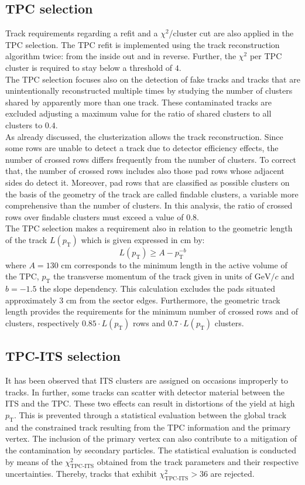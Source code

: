 \documentclass[12pt,a4paper]{report}
\begin{document}
\subsection{TPC selection}
Track requirements regarding a refit and a $\chi^2$/cluster cut are also applied in the TPC selection. The TPC refit is implemented using the track reconstruction algorithm twice: from the inside out and in reverse. Further, the $\chi^2$ per TPC cluster is required to stay below a threshold of $4$. \\
The TPC selection focuses also on the detection of fake tracks and tracks that are unintentionally reconstructed multiple times by studying the number of clusters shared by apparently more than one track. These contaminated tracks are excluded adjusting a maximum value for the ratio of shared clusters to all clusters to $0.4$.\\
As already discussed, the clusterization allows the track reconstruction. Since some rows are unable to detect a track due to detector efficiency effects, the number of crossed rows differs frequently from the number of clusters. To correct that, the number of crossed rows includes also those pad rows whose adjacent sides do detect it. Moreover, pad rows that are classified as possible clusters on the basis of the geometry of the track are called findable clusters, a variable more comprehensive than the number of clusters. In this analysis, the ratio of crossed rows over findable clusters must exceed a value of $0.8$. \\
The TPC selection makes a requirement also in relation to the geometric length of the track $L(p_\text{T})$ which is given expressed in cm by:
\begin{equation}
L(p_\text{T}) \geq A - p_\text{T}^{-b}
\end{equation}
where $A=130 \text{ cm}$ corresponds to the minimum length in the active volume of the TPC, $p_\text{T}$ the transverse momentum of the track given in units of $\text{GeV}/c$ and $b=-1.5$ the slope dependency. This calculation excludes the pads situated approximately $3\text{ cm}$ from the sector edges. Furthermore, the geometric track length provides the requirements for the minimum number of crossed rows and of clusters, respectively $0.85\cdot L(p_\text{T})$ rows and $0.7\cdot L(p_\text{T})$ clusters.
\subsection{TPC-ITS selection}
It has been observed that ITS clusters are assigned on occasions improperly to tracks. In further, some tracks can scatter with detector material between the ITS and the TPC. These two effects can result in distortions of the yield	at high $p_\text{T}$. This is prevented through a statistical evaluation between the global track and the constrained track resulting from the TPC information and the primary vertex. The inclusion of the primary vertex can also contribute to a mitigation of the contamination by secondary particles. The statistical evaluation is conducted by means of the $\chi^2_\text{TPC-ITS}$ obtained from the track parameters and their respective uncertainties. Thereby, tracks that exhibit $\chi^2_\text{TPC-ITS}>36$ are rejected.
\fi
\end{document}
